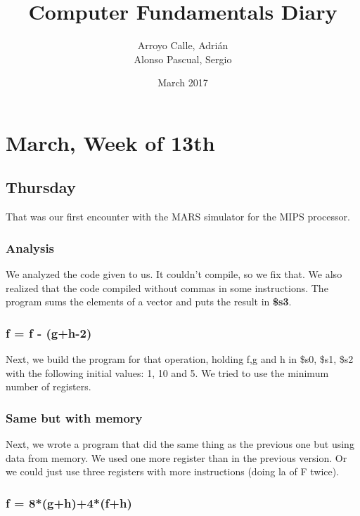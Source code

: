 \documentclass{report}
\title{Computer Fundamentals Diary}
\author{Arroyo Calle, Adrián \\ Alonso Pascual, Sergio}
\date{March 2017}
\begin{document}
\maketitle

\tableofcontents

\chapter{March, Week of 13th}

\section{Thursday}

That was our first encounter with the MARS simulator for the MIPS processor.

\subsection{Analysis}

We analyzed the code given to us. It couldn't compile, so we fix that. We also realized that the code compiled without commas in some instructions. The program sums the elements of a vector and puts the result in \textbf{\$s3}.

\subsection{f = f - (g+h-2) }

Next, we build the program for that operation, holding f,g and h in \$s0, \$s1, \$s2 with the following initial values: 1, 10 and 5. We tried to use the minimum number of registers.



\subsection{Same but with memory}

Next, we wrote a program that did the same thing as the previous one but using data from memory. We used one more register than in the previous version. Or we could just use three registers with more instructions (doing la of F twice).



\subsection{f = 8*(g+h)+4*(f+h)}
\end{document}
